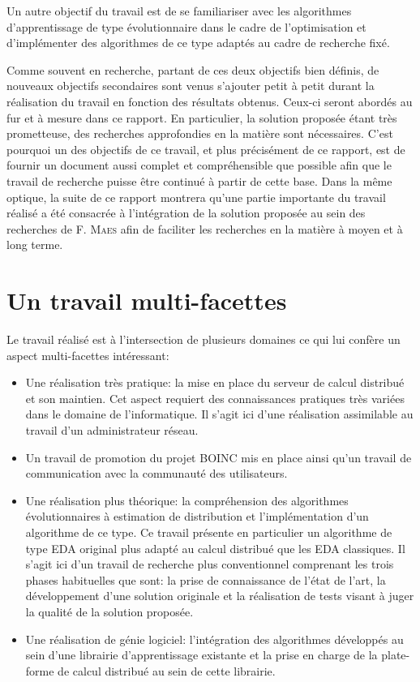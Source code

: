\documentclass[a4paper, 12pt]{report}
\begin{document}
Un autre objectif du travail est de se familiariser avec les algorithmes d'apprentissage de type évolutionnaire dans le cadre de l'optimisation et d'implémenter des algorithmes de ce type adaptés au cadre de recherche fixé.

Comme souvent en recherche, partant de ces deux objectifs bien définis, de nouveaux objectifs secondaires sont venus s'ajouter petit à petit durant la réalisation du travail en fonction des résultats obtenus. Ceux-ci seront abordés au fur et à mesure dans ce rapport. En particulier, la solution proposée étant très prometteuse, des recherches approfondies en la matière sont nécessaires. C'est pourquoi un des objectifs de ce travail, et plus précisément de ce rapport, est de fournir un document aussi complet et compréhensible que possible afin que le travail de recherche puisse être continué à partir de cette base. Dans la même optique, la suite de ce rapport montrera qu'une partie importante du travail réalisé a été consacrée à l'intégration de la solution proposée au sein des recherches de F. \textsc{Maes} afin de faciliter les recherches en la matière à moyen et à long terme. 

\section{Un travail multi-facettes}
\label{multifacette}
Le travail réalisé est à l'intersection de plusieurs domaines ce qui lui confère un aspect multi-facettes intéressant: 
\begin{itemize}
\item Une réalisation très pratique: la mise en place du serveur de calcul distribué et son maintien. Cet aspect requiert des connaissances pratiques très variées dans le domaine de l'informatique. Il s'agit ici d'une réalisation assimilable au travail d'un administrateur réseau.
\item Un travail de promotion du projet \textsc{BOINC} mis en place ainsi qu'un travail de communication avec la communauté des utilisateurs.
\item Une réalisation plus théorique: la compréhension des algorithmes évolutionnaires à estimation de distribution et l'implémentation d'un algorithme de ce type. Ce travail présente en particulier un algorithme de type EDA original plus adapté au calcul distribué que les EDA classiques. Il s'agit ici d'un travail de recherche plus conventionnel comprenant les trois phases habituelles que sont: la prise de connaissance de l'état de l'art, la développement d'une solution originale et la réalisation de tests visant à juger la qualité de la solution proposée.
\item Une réalisation de génie logiciel: l'intégration des algorithmes développés au sein d'une librairie d'apprentissage existante et la prise en charge de la plate-forme de calcul distribué au sein de cette librairie. 
\end{itemize}
\end{document}
